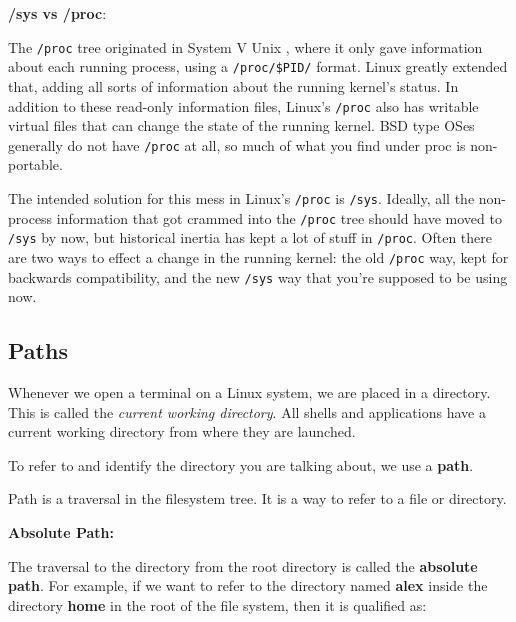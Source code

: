 \textbf{/sys vs /proc}:

The \texttt{/proc} tree originated in System V Unix
, where it only gave information about each running process, using a
\texttt{/proc/\$PID/} format. Linux greatly extended that, adding all sorts of information about the running kernel's status. In addition to these read-only information files, Linux's \texttt{/proc} also has writable virtual files that can change the state of the running kernel.
BSD
type OSes generally do not have \texttt{/proc} at all, so much of what you find under proc is non-portable.

The intended solution for this mess in Linux's \texttt{/proc} is \texttt{/sys}. Ideally, all the non-process information that got crammed into the \texttt{/proc} tree should have moved to \texttt{/sys} by now, but historical inertia has kept a lot of stuff in \texttt{/proc}.
Often there are two ways to effect a change in the running kernel: the old \texttt{/proc} way, kept for backwards compatibility, and the new \texttt{/sys} way that you're supposed to be using now.

\subsection{Paths}

Whenever we open a terminal on a Linux system, we are placed in a directory.
This is called the \textit{current working directory}.
All shells and applications have a current working directory from where they are launched.

To refer to and identify the directory you are talking about, we use a \textbf{path}.

\begin{definition}[Path]
  Path is a traversal in the filesystem tree.
  It is a way to refer to a file or directory.
\end{definition}

\textbf{Absolute Path:}

The traversal to the directory from the root directory is called the \textbf{absolute path}. For example, if we want to refer to the directory named \textbf{alex} inside the directory \textbf{home} in the root of the file system, then it is qualified as:

